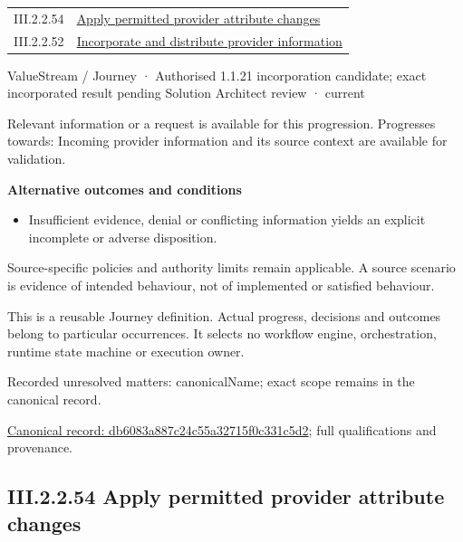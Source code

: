\begin{longtable}{p{.22\linewidth}p{.73\linewidth}}
III.2.2.54 & \hyperref[element:1ceb340083984b9fbe393532c69abe72]{Apply permitted provider attribute changes} \\
III.2.2.52 & \hyperref[element:9eb9f3210d5e4b46ac21463f54e62ab9]{Incorporate and distribute provider information} \\
\end{longtable}
\label{element:db6083a887c24c55a32715f0c331c5d2}
{\small ValueStream / Journey · Authorised 1.1.21 incorporation candidate; exact incorporated result pending Solution Architect review · current}\par

Relevant information or a request is available for this progression. Progresses towards: Incoming provider information and its source context are available for validation.



\par\medskip\textbf{Alternative outcomes and conditions}\par


\begin{itemize}


\item Insufficient evidence, denial or conflicting information yields an explicit incomplete or adverse disposition.

\end{itemize}


Source-specific policies and authority limits remain applicable. A source scenario is evidence of intended behaviour, not of implemented or satisfied behaviour.



This is a reusable Journey definition. Actual progress, decisions and outcomes belong to particular occurrences. It selects no workflow engine, orchestration, runtime state machine or execution owner.


{\small Recorded unresolved matters: canonicalName; exact scope remains in the canonical record.}\par
{\footnotesize \href{../../../../continuum/strategy/value-stream/db6083a887c24c55a32715f0c331c5d2.md}{Canonical record: db6083a887c24c55a32715f0c331c5d2}; full qualifications and provenance.}\par
\subsection*{III.2.2.54 Apply permitted provider attribute changes}
\label{navigation:III.2.2.54}

